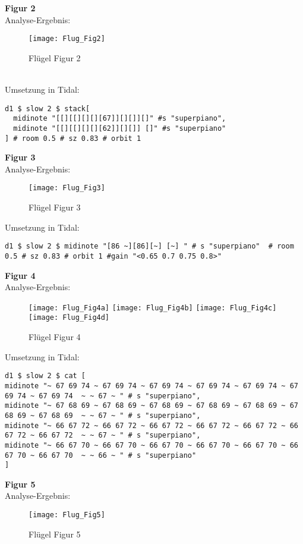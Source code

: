 \documentclass[
10pt, %
a4paper, %
oneside, %
headinclude,footinclude, %
BCOR5mm, %
]{scrartcl}
\begin{document}
\noindent \textbf{Figur 2}\\
Analyse-Ergebnis:\\
\begin{figure}[h]
	\centering 
	\texttt{[image: Flug\_Fig2]} 
	\caption{Flügel Figur 2}
\end{figure}\\
\noindent Umsetzung in Tidal:
\begin{lstlisting}
d1 $ slow 2 $ stack[
  midinote "[[][[][][][67]][][]][]" #s "superpiano",
  midinote "[[][[][][][62]][][]] []" #s "superpiano"
] # room 0.5 # sz 0.83 # orbit 1
\end{lstlisting}

\noindent \textbf{Figur 3}\\
Analyse-Ergebnis:
\begin{figure}[h]
	\centering 
	\texttt{[image: Flug\_Fig3]} 
	\caption{Flügel Figur 3}
\end{figure}

\noindent Umsetzung in Tidal:
\begin{lstlisting}
d1 $ slow 2 $ midinote "[86 ~][86][~] [~] " # s "superpiano"  # room 0.5 # sz 0.83 # orbit 1 #gain "<0.65 0.7 0.75 0.8>"
\end{lstlisting}


\noindent \textbf{Figur 4}\\
Analyse-Ergebnis:
\begin{figure}[h]
	\centering 
	\texttt{[image: Flug\_Fig4a]} 
	\texttt{[image: Flug\_Fig4b]} 
	\texttt{[image: Flug\_Fig4c]} 
	\texttt{[image: Flug\_Fig4d]} 
	\caption{Flügel Figur 4}
\end{figure}

\noindent Umsetzung in Tidal:
\begin{lstlisting}
d1 $ slow 2 $ cat [
midinote "~ 67 69 74 ~ 67 69 74 ~ 67 69 74 ~ 67 69 74 ~ 67 69 74 ~ 67 69 74 ~ 67 69 74  ~ ~ 67 ~ " # s "superpiano",
midinote "~ 67 68 69 ~ 67 68 69 ~ 67 68 69 ~ 67 68 69 ~ 67 68 69 ~ 67 68 69 ~ 67 68 69  ~ ~ 67 ~ " # s "superpiano",
midinote "~ 66 67 72 ~ 66 67 72 ~ 66 67 72 ~ 66 67 72 ~ 66 67 72 ~ 66 67 72 ~ 66 67 72  ~ ~ 67 ~ " # s "superpiano",
midinote "~ 66 67 70 ~ 66 67 70 ~ 66 67 70 ~ 66 67 70 ~ 66 67 70 ~ 66 67 70 ~ 66 67 70  ~ ~ 66 ~ " # s "superpiano"
]
\end{lstlisting}

\noindent \textbf{Figur 5}\\
Analyse-Ergebnis:
\begin{figure}[h]
	\centering 
	\texttt{[image: Flug\_Fig5]} 
	\caption{Flügel Figur 5}
\end{figure}
\end{document}
